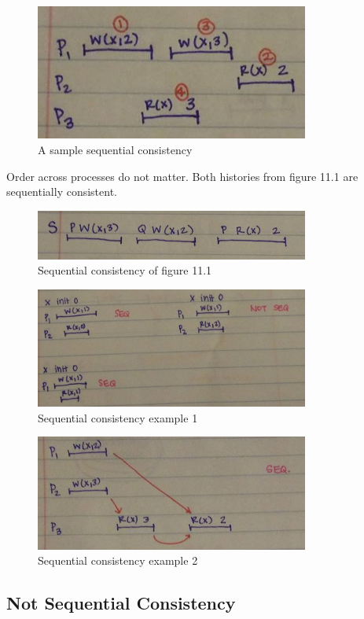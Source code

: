 \documentclass[twoside]{article}
\begin{document}
\begin{figure}[ht!]
\centering
\includegraphics[width=90mm]{pic_3.jpg}
\caption{A sample sequential consistency \label{overflow}}
\end{figure}
Order across processes do not matter. Both histories from figure 11.1 are sequentially consistent.
\begin{figure}[ht!]
\centering
\includegraphics[width=90mm]{pic_2.jpg}
\caption{Sequential consistency of figure 11.1 \label{overflow}}
\end{figure}
\begin{figure}[ht!]
\centering
\includegraphics[width=90mm]{pic_7.jpg}
\caption{Sequential consistency example 1 \label{overflow}}
\end{figure}
\begin{figure}[ht!]
\centering
\includegraphics[width=90mm]{pic_5.jpg}
\caption{Sequential consistency example 2 \label{overflow}}
\end{figure}


\subsection{Not Sequential Consistency}
\end{document}
